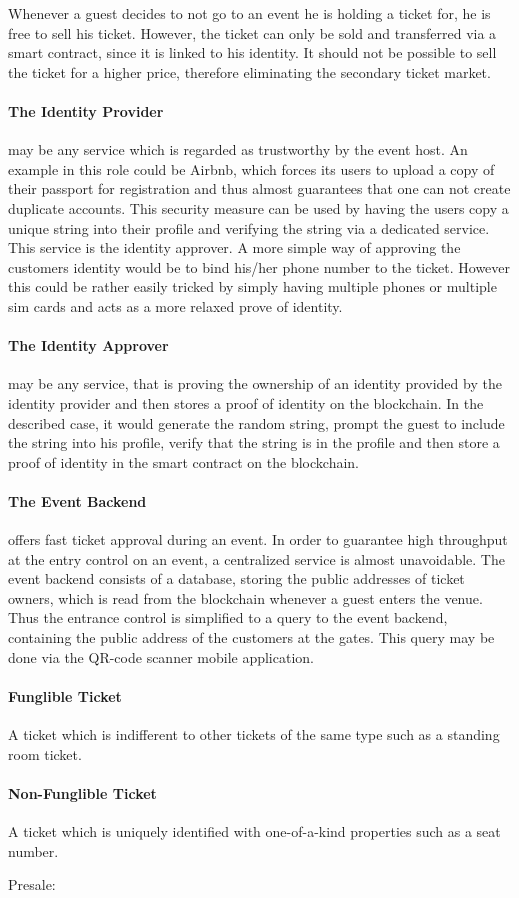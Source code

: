 Whenever a guest decides to not go to an event he is holding a ticket for, he is free to sell his ticket. However, the ticket can only be sold and transferred via a smart contract, since it is linked to his identity. It should not be possible to sell the ticket for a higher price, therefore eliminating the secondary ticket market.

\paragraph{The Identity Provider} may be any service which is regarded as trustworthy by the event host. An example in this role could be Airbnb, which forces its users to upload a copy of their passport for registration and thus almost guarantees that one can not create duplicate accounts. This security measure can be used by having the users copy a unique string into their profile and verifying the string via a dedicated service. This service is the identity approver. A more simple way of approving the customers identity would be to bind his/her phone number to the ticket. However this could be rather easily tricked by simply having multiple phones or multiple sim cards and acts as a more relaxed prove of identity.

\paragraph{The Identity Approver} may be any service, that is proving the ownership of an identity provided by the identity provider and then stores a proof of identity on the blockchain. In the described case, it would generate the random string, prompt the guest to include the string into his profile, verify that the string is in the profile and then store a proof of identity in the smart contract on the blockchain.

\paragraph{The Event Backend} offers fast ticket approval during an event. In order to guarantee high throughput at the entry control on an event, a centralized service is almost unavoidable. The event backend consists of a database, storing the public addresses of ticket owners, which is read from the blockchain whenever a guest enters the venue. Thus the entrance control is simplified to a query to the event backend, containing the public address of the customers at the gates. This query may be done via the QR-code scanner mobile application.

\paragraph{Funglible Ticket}A ticket which is indifferent to other tickets of the same type such as a standing room ticket.

\paragraph{Non-Funglible Ticket}A ticket which is uniquely identified with one-of-a-kind properties such as a seat number.


Presale: